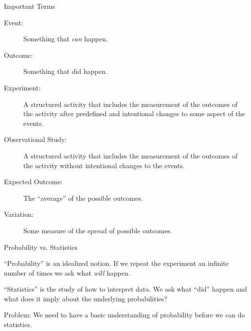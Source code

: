 \begin{frame}{Important Terms}

  \begin{description}
  \item[Event:] Something that \textit{can} happen.
  \item[Outcome:] Something that did happen.
  \item[Experiment:] A structured activity that includes the
    measurement of the outcomes of the activity after predefined and
    intentional changes to some aspect of the events.
  \item[Observational Study:] A structured activity that includes the
    measurement of the outcomes of the activity without intentional
    changes to the events.
  \item[Expected Outcome:] The ``average'' of the possible outcomes.
  \item[Variation:] Some measure of the spread of possible outcomes.
  \end{description}
  
\end{frame}

\begin{frame}{Probability vs. Statistics}

  ``Probability'' is an idealized notion. If we repeat the experiment
  an infinite number of times we ask what \textit{will} happen.

  \vfill

  ``Statistics'' is the study of how to interpret data. We ask what
  ``did'' happen and what does it imply about the underlying
  probabilities?

  \vfill

  {

    Problem: We need to have a basic understanding of probability
    before we can do statistics.

  }
  
\end{frame}

